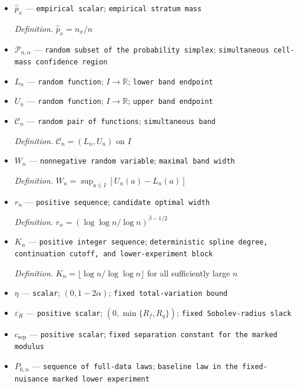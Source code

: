 \documentclass{article}
\begin{document}
\begin{itemize}
  \par\smallskip\noindent\emph{Definition.} \(n_x=\sum_{i=1}^n\mathbf 1\{X_i=x\}\)
  \item \(\widehat p_x\) --- \texttt{empirical scalar}; \texttt{empirical stratum mass}
  \par\smallskip\noindent\emph{Definition.} \(\widehat p_x=n_x/n\)
  \item \(\mathcal P_{n,\alpha}\) --- \texttt{random subset of the probability simplex}; \texttt{simultaneous cell-\allowbreak{}mass confidence region}
  \item \(L_n\) --- \texttt{random function}; \(I\to\mathbb R\); \texttt{lower band endpoint}
  \item \(U_n\) --- \texttt{random function}; \(I\to\mathbb R\); \texttt{upper band endpoint}
  \item \(\mathcal C_n\) --- \texttt{random pair of functions}; \texttt{simultaneous band}
  \par\smallskip\noindent\emph{Definition.} \(\mathcal C_n=(L_n,U_n)\) on \(I\)
  \item \(W_n\) --- \texttt{nonnegative random variable}; \texttt{maximal band width}
  \par\smallskip\noindent\emph{Definition.} \(W_n=\sup_{a\in I}[U_n(a)-L_n(a)]\)
  \item \(r_n\) --- \texttt{positive sequence}; \texttt{candidate optimal width}
  \par\smallskip\noindent\emph{Definition.} \(r_n=(\log\log n/\log n)^{\beta-1/2}\)
  \item \(K_n\) --- \texttt{positive integer sequence}; \texttt{deterministic spline degree,\allowbreak{} continuation cutoff,\allowbreak{} and lower-\allowbreak{}experiment block}
  \par\smallskip\noindent\emph{Definition.} \(K_n=\lfloor\log n/\log\log n\rfloor\) for all sufficiently large \(n\)
  \item \(\eta\) --- \texttt{scalar}; \((0,1-2\alpha)\); \texttt{fixed total-\allowbreak{}variation bound}
  \item \(\varepsilon_R\) --- \texttt{positive scalar}; \((0,\min\{R_f,R_q\})\); \texttt{fixed Sobolev-\allowbreak{}radius slack}
  \item \(c_{\mathrm{sep}}\) --- \texttt{positive scalar}; \texttt{fixed separation constant for the marked modulus}
  \item \(P_{0,n}\) --- \texttt{sequence of full-\allowbreak{}data laws}; \texttt{baseline law in the fixed-\allowbreak{}nuisance marked lower experiment}

\end{itemize}
\end{document}
